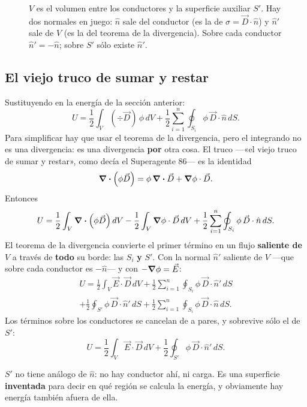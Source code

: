 \documentclass[12pt,a4paper]{article}
\begin{document}
\begin{figure}[H]
  \centering
  
  \caption{$V$ es el volumen entre los conductores y la superficie auxiliar $S'$.
  Hay dos normales en juego: $\hat n$ sale del conductor (es la de
  $\sigma = \vec D\cdot\hat n$) y $\hat n'$ sale de $V$ (es la del teorema de la
  divergencia). Sobre cada conductor $\hat n' = -\hat n$; sobre $S'$ sólo existe
  $\hat n'$.}
\end{figure}

\subsection{El viejo truco de sumar y restar}

Sustituyendo en la energía de la sección anterior:
\[
U = \frac12\int_V (\div\vec D)\,\phi\,dV
+ \frac12\sum_{i=1}^{n}\oint_{S_i}\phi\,\vec D\cdot\hat n\,dS .
\]
Para simplificar hay que usar el teorema de la divergencia, pero el integrando no
es una divergencia: es una divergencia \textbf{por} otra cosa. El truco ---«el
viejo truco de sumar y restar», como decía el Superagente 86--- es la identidad
\[
\div(\phi\vec D) = \phi\,\div\vec D + \grad\phi\cdot\vec D .
\]
Entonces
\[
U = \frac12\int_V \div(\phi\vec D)\,dV
- \frac12\int_V \grad\phi\cdot\vec D\,dV
+ \frac12\sum_{i=1}^{n}\oint_{S_i}\phi\,\vec D\cdot\hat n\,dS .
\]
El teorema de la divergencia convierte el primer término en un flujo
\textbf{saliente de $V$} a través de \textbf{todo} su borde: las $S_i$
\textbf{y} $S'$. Con la normal $\hat n'$ saliente de $V$ ---que sobre cada
conductor es $-\hat n$--- y con $-\grad\phi = \vec E$:
\begin{multline*}
U = \frac12\int_V \vec E\cdot\vec D\,dV
+ \frac12\sum_{i=1}^{n}\oint_{S_i}\phi\,\vec D\cdot\hat n'\,dS\\
+ \frac12\oint_{S'}\phi\,\vec D\cdot\hat n'\,dS
+ \frac12\sum_{i=1}^{n}\oint_{S_i}\phi\,\vec D\cdot\hat n\,dS .
\end{multline*}
Los términos sobre los conductores se cancelan de a pares, y sobrevive sólo el de
$S'$:
\[
U = \frac12\int_V \vec E\cdot\vec D\,dV + \frac12\oint_{S'}\phi\,\vec D\cdot\hat n'\,dS .
\]

\begin{notebox}[$S'$ es un invento]
$S'$ no tiene análogo de $\hat n$: no hay conductor ahí, ni carga. Es una
superficie \textbf{inventada} para decir en qué región se calcula la energía, y
obviamente hay energía también afuera de ella.
\end{notebox}
\end{document}

